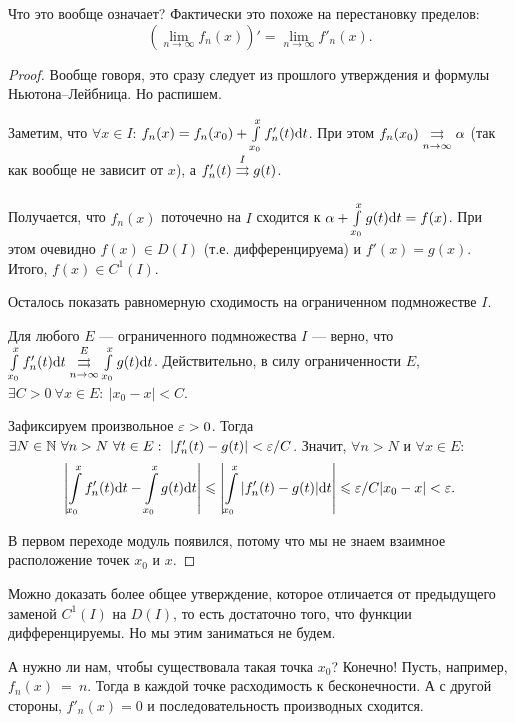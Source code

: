 Что это вообще означает? Фактически это похоже на перестановку пределов:
$$
(\lim\limits_{n \to \infty} f_n(x))' = \lim\limits_{n \to \infty} f'_n(x). 
$$

\begin{proof}
Вообще говоря, это сразу следует из прошлого утверждения и формулы Ньютона--Лейбница. Но распишем.

Заметим, что $\forall x \in I$: $f_n(x) = f_n(x_0) + \int\limits_{x_0}^x f'_n(t) \mathrm{d} t$. При этом $f_n(x_0) \overset{}{\underset{n \to \infty}{\rightrightarrows}} \alpha$ (так как вообще не зависит от $x$), а $f'_n(t) \overset{I}{\underset{}{\rightrightarrows}} g(t)$.

Получается, что $f_n(x)$ поточечно на $I$ сходится к $\alpha + \int\limits_{x_0}^x g(t)\mathrm{d} t = f(x)$. При этом очевидно $f(x) \in D(I)$ (т.е. дифференцируема) и $f'(x) = g(x)$. Итого, $f(x) \in C^1(I)$.

Осталось показать равномерную сходимость на ограниченном подмножестве $I$.

Для любого $E$ --- ограниченного подмножества $I$ --- верно, что $\int\limits_{x_0}^xf'_n(t) \mathrm{d} t \overset{E}{\underset{n \to \infty}{\rightrightarrows}} \int\limits_{x_0}^x g(t) \mathrm{d} t$. Действительно, в силу ограниченности $E$, $\exists C > 0\ \forall x \in E: \ |x_0 - x| < C$.

Зафиксируем произвольное $\varepsilon > 0$. Тогда $\exists N \in \mathbb{N}\ \forall n > N\ \forall t \in E:\ |f'_n(t) - g(t)| < \varepsilon/C$. Значит, $\forall n > N$ и $\forall x \in E$:
\begin{gather}
\left| \int\limits_{x_0}^x f'_n(t) \mathrm{d} t - \int\limits_{x_0}^x g(t) \mathrm{d} t \right| \leqslant \left| \int\limits_{x_0}^x |f'_n(t) - g(t)| \mathrm{d} t \right| \leqslant \varepsilon/C |x_0 - x| < \varepsilon.
\end{gather}

В первом переходе модуль появился, потому что мы не знаем взаимное расположение точек $x_0$ и $x$.
\end{proof}

Можно доказать более общее утверждение, которое отличается от предыдущего заменой $C^1(I)$ на $D(I)$, то есть достаточно того, что функции дифференцируемы. Но мы этим заниматься не будем.

А нужно ли нам, чтобы существовала такая точка $x_0$? Конечно! Пусть, например, $f_n(x)~=~n$. Тогда в каждой точке расходимость к бесконечности. А с другой стороны, $f'_n(x) = 0$ и последовательность производных сходится.

